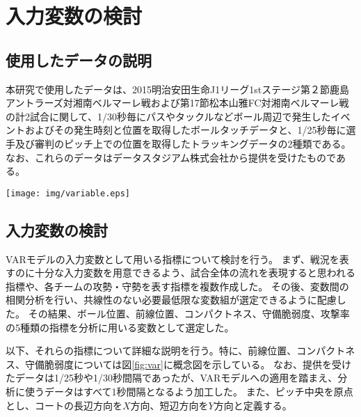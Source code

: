 \section{入力変数の検討}
\label{sec:input}

\subsection{使用したデータの説明}
本研究で使用したデータは、2015明治安田生命J1リーグ1stステージ第２節鹿島アントラーズ対湘南ベルマーレ戦および第17節松本山雅FC対湘南ベルマーレ戦の計2試合に関して、1/30秒毎にパスやタックルなどボール周辺で発生したイベントおよびその発生時刻と位置を取得したボールタッチデータと、1/25秒毎に選手及び審判のピッチ上での位置を取得したトラッキングデータの2種類である。
なお、これらのデータはデータスタジアム株式会社から提供を受けたものである。


\begin{figure*}[htbp]
  \begin{center} %
    \texttt{[image: img/variable.eps]}
    \renewcommand{\baselinestretch}{1}%
    \caption{入力変数の概念図．　(a)前線位置。両チームの選手がなす支配領域が均衡する前線の$X$座標に関する平均値。図中の白色破線に対応。(b)コンパクトネス。一番前方の選手と後方2番目の選手の$X$座標上の距離。図中の灰色と白色の四角形の幅にそれぞれ対応。(c)守備脆弱度。自軍のオフサイドラインより前方10m、後方5mの長方形のうち、最寄りの味方選手から5m以上離れており、最近傍選手が相手選手であるような地点の合計面積の割合。図中の灰色で囲まれている図形の合計面積が占める割合に相当。}
    \label{fig:var} %
  \end{center}
\end{figure*}


\subsection{入力変数の検討}
VARモデルの入力変数として用いる指標について検討を行う。
まず、戦況を表すのに十分な入力変数を用意できるよう、試合全体の流れを表現すると思われる指標や、各チームの攻勢・守勢を表す指標を複数作成した。
その後、変数間の相関分析を行い、共線性のない必要最低限な変数組が選定できるように配慮した。
その結果、ボール位置、前線位置、コンパクトネス、守備脆弱度、攻撃率の5種類の指標を分析に用いる変数として選定した。

以下、それらの指標について詳細な説明を行う。特に、前線位置、コンパクトネス、守備脆弱度については図\ref{fig:var}に概念図を示している。
なお、提供を受けたデータは1/25秒や1/30秒間隔であったが、VARモデルへの適用を踏まえ、分析に使うデータはすべて1秒間隔となるよう加工した。
また、ピッチ中央を原点とし、コートの長辺方向を$X$方向、短辺方向を$Y$方向と定義する。




